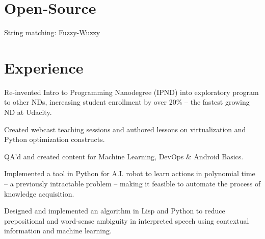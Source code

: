 \documentclass[]{deedy-resume-openfont}
\begin{document}
\begin{minipage}[t]{0.31\textwidth}
\section{Open-Source}
\textbullet{} String matching: \underline{\href{https://github.com/seatgeek/fuzzywuzzy}{Fuzzy-Wuzzy}} 

%
%

\end{minipage} 
\hfill
\begin{minipage}[t]{0.66\textwidth} 


\section{Experience}

\vspace{\topsep} %
\begin{tightemize}

\item Re-invented Intro to Programming Nanodegree (IPND) into exploratory program to other NDs, increasing student enrollment by over 20\% -- the fastest growing ND at Udacity.

\item Created webcast teaching sessions and authored lessons on virtualization and Python optimization constructs.

\item QA'd and created content for Machine Learning, DevOps \& Android Basics.

\end{tightemize}
\sectionsep

\begin{tightemize}
\item Implemented a tool in Python for A.I. robot to learn actions in polynomial time -- a previously intractable problem -- making it feasible to automate the process of knowledge acquisition.

\item Designed and implemented an algorithm in Lisp and Python to reduce prepositional and word-sense ambiguity in interpreted speech using contextual information and machine learning.
\end{tightemize}
\sectionsep


\end{minipage}
\end{document}
